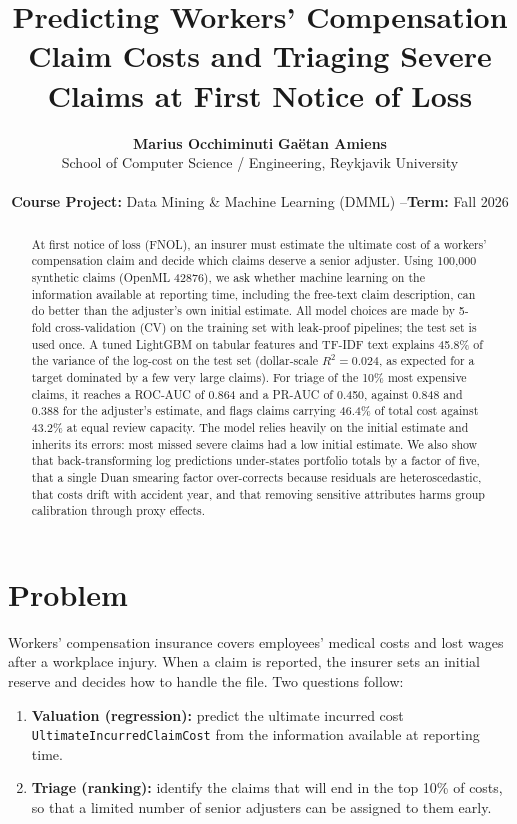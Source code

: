 \documentclass[10pt,twocolumn,letterpaper]{article}
\title{\huge \bfseries \color{navyblue} Predicting Workers' Compensation Claim Costs and Triaging Severe Claims at First Notice of Loss}
\author{
    \textbf{Marius Occhiminuti} \quad \textbf{Ga\"etan Amiens} \\
    School of Computer Science / Engineering, Reykjavik University \\
    \vspace{2pt} \\
    \small \textbf{Course Project:} Data Mining \& Machine Learning (DMML) \quad--\quad \textbf{Term:} Fall 2026
}
\date{}
\begin{document}
\maketitle

\begin{abstract}
At first notice of loss (FNOL), an insurer must estimate the ultimate cost of a workers' compensation claim and decide which
claims deserve a senior adjuster. Using 100,000 synthetic claims (OpenML 42876), we ask whether machine learning on the
information available at reporting time, including the free-text claim description, can do better than the adjuster's own
initial estimate. All model choices are made by 5-fold cross-validation (CV) on the training set with leak-proof pipelines;
the test set is used once. A tuned LightGBM on tabular features and TF-IDF text explains 45.8\% of the variance of the
log-cost on the test set (dollar-scale $R^2 = 0.024$, as expected for a target dominated by a few very large claims). For
triage of the 10\% most expensive claims, it reaches a ROC-AUC of 0.864 and a PR-AUC of 0.450, against 0.848 and 0.388 for
the adjuster's estimate, and flags claims carrying 46.4\% of total cost against 43.2\% at equal review capacity. The model
relies heavily on the initial estimate and inherits its errors: most missed severe claims had a low initial estimate. We
also show that back-transforming log predictions under-states portfolio totals by a factor of five, that a single Duan
smearing factor over-corrects because residuals are heteroscedastic, that costs drift with accident year, and that
removing sensitive attributes harms group calibration through proxy effects.
\end{abstract}

\section{Problem}
Workers' compensation insurance covers employees' medical costs and lost wages after a workplace injury. When a claim is
reported, the insurer sets an initial reserve and decides how to handle the file. Two questions follow:
\begin{enumerate}
    \item \textbf{Valuation (regression):} predict the ultimate incurred cost \texttt{UltimateIncurredClaimCost} from the
    information available at reporting time.
    \item \textbf{Triage (ranking):} identify the claims that will end in the top 10\% of costs, so that a limited number of
    senior adjusters can be assigned to them early.
\end{enumerate}
\end{document}
